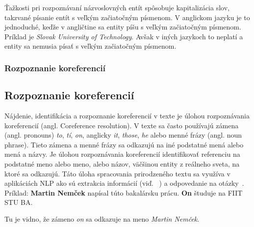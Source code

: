 Ťažkosti pri rozpoznávaní názvoslovných entít spôsobuje kapitalizácia slov, takzvané písanie entít s veľkým začiatočným písmenom. V anglickom jazyku je to jednoduché, keďže v angličtine sa entity píšu s veľkým začiatočným písmenom.
\\

Príklad je \textit{Slovak University of Technology}. Avšak v iných jazykoch to neplatí a entity sa nemusia písať s veľkým začiatočným písmenom.

%
%
{
	\subsubsection{Rozpoznanie koreferencií}
}
{
	\subsection{Rozpoznanie koreferencií}
}
\label{subsubsec:corefparsing}
Nájdenie, identifikácia a rozpoznanie koreferencií v texte je úlohou rozpoznávania koreferencií (angl. Coreference resolution). V texte sa často používajú zámena (angl. pronouns) \textit{to}, \textit{tí}, \textit{on}, anglicky \textit{it}, \textit{those}, \textit{he} alebo menné frázy (angl. noun phrase). Tieto zámena a menné frázy sa odkazujú na iné podstatné mená alebo mená a názvy. Je úlohou rozpoznávania koreferencií identifikovať referenciu na podstatné meno alebo meno, alebo názov, väčšinou entity z reálneho sveta, na ktoré sa odkazujú. Táto úloha spracovania prirodzeného textu sa využíva v aplikáciách NLP ako sú extrakcia informácií (viď. ~) a odpovedanie na otázky~\cite{Bryl}.
\\

Príklad:
\textbf{Martin Nemček} napísal túto bakalársku prácu. \textbf{On} študuje na FIIT STU BA.

Tu je vidno, že zámeno \textit{on} sa odkazuje na meno \textit{Martin Nemček}.

